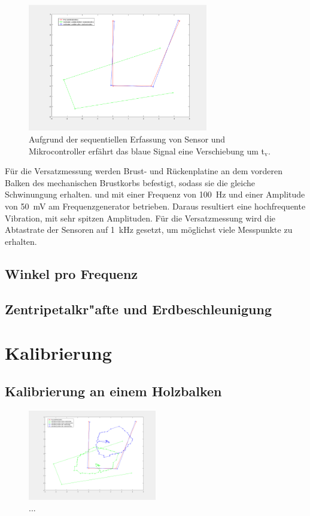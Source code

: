 	\begin{figure}[h]
		\centering
		\includegraphics[width=0.7\textwidth]{images/versatz.png}
		\caption[Versatz zwischen zwei Signalen]{Aufgrund der sequentiellen Erfassung von Sensor und Mikrocontroller erfährt das blaue Signal eine Verschiebung um t$_\text{v}$.}
		\label{img:versatz}
	\end{figure}

	Für die Versatzmessung werden Brust- und Rückenplatine an dem vorderen Balken des mechanischen Brustkorbs befestigt, sodass sie die gleiche Schwinungung erhalten. und mit einer Frequenz von 100~Hz und einer Amplitude von 50~mV am Frequenzgenerator betrieben. Daraus resultiert eine hochfrequente Vibration, mit sehr spitzen Amplituden. Für die Versatzmessung wird die Abtastrate der Sensoren auf 1~kHz gesetzt, um möglichst viele Messpunkte zu erhalten.
	
	\subsection{Winkel pro Frequenz}
	
	\subsection{Zentripetalkr"afte und Erdbeschleunigung}
	
\newpage
	
\section{Kalibrierung}

	\subsection{Kalibrierung an einem Holzbalken}
	
	\begin{figure}[h]
		\centering
		\includegraphics[width=0.5\textwidth]{images/KalibrierungHolzgestell}
		\caption[Kalibrierung an einem Holzbalken]{...}
		\label{img:holzbalken}
	\end{figure}

